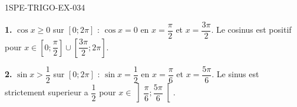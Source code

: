 \begin{corrige}{1SPE-TRIGO-EX-034}

\textbf{1.} $\cos x \geqslant 0$ sur $[0;2\pi]$ : $\cos x = 0$ en $x = \dfrac{\pi}{2}$ et $x = \dfrac{3\pi}{2}$. Le cosinus est positif pour $x \in \left[0;\dfrac{\pi}{2}\right] \cup \left[\dfrac{3\pi}{2};2\pi\right]$.

\textbf{2.} $\sin x > \dfrac{1}{2}$ sur $[0;2\pi]$ : $\sin x = \dfrac{1}{2}$ en $x = \dfrac{\pi}{6}$ et $x = \dfrac{5\pi}{6}$. Le sinus est strictement superieur a $\dfrac{1}{2}$ pour $x \in \left]\dfrac{\pi}{6};\dfrac{5\pi}{6}\right[$.

\end{corrige}
